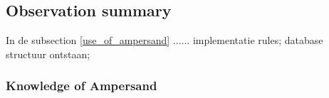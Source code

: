 \begin{comment}
hier een samenvatting van de onderstaande obeservaties.
\end{comment}
\subsection{Observation summary}
In de subsection \ref{use_of_ampersand} ......
implementatie rules; database structuur ontstaan; 

\subsubsection{Knowledge of Ampersand}
\begin{comment}
- wat zijn de exacte waarnemingen geweest!
plaats hier de afgehandelde items.


\end{comment}



